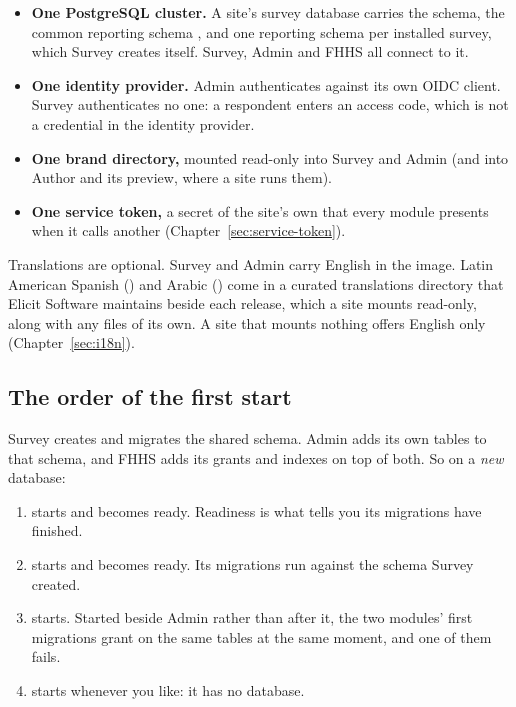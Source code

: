 \documentclass[11pt, a4paper]{article}
\begin{document}
\begin{itemize}
  \item \textbf{One PostgreSQL cluster.} A site's survey database carries the
         schema, the common reporting schema , and one
        reporting schema per installed survey, which Survey creates itself. Survey, Admin
        and FHHS all connect to it.
  \item \textbf{One identity provider.} Admin authenticates against its own OIDC client.
        Survey authenticates no one: a respondent enters an access code, which is not a
        credential in the identity provider.
  \item \textbf{One brand directory,} mounted read-only into Survey and Admin (and into
        Author and its preview, where a site runs them).
  \item \textbf{One service token,} a secret of the site's own that every module presents when
        it calls another (Chapter~\ref{sec:service-token}).
\end{itemize}

Translations are optional. Survey and Admin carry English in the image. Latin American Spanish
() and Arabic () come in a curated translations directory that
Elicit Software maintains beside each release, which a site mounts read-only, along with any
files of its own. A site that mounts nothing offers English only (Chapter~\ref{sec:i18n}).

\subsection{The order of the first start}

Survey creates and migrates the shared  schema. Admin adds its own tables to that
schema, and FHHS adds its grants and indexes on top of both. So on a \emph{new} database:

\begin{enumerate}
  \item {} starts and becomes ready. Readiness is what tells you its migrations
        have finished.
  \item {} starts and becomes ready. Its migrations run against the schema Survey
        created.
  \item {} starts. Started beside Admin rather than after it, the two modules' first
        migrations grant on the same tables at the same moment, and one of them fails.
  \item {} starts whenever you like: it has no database.
\end{enumerate}
\end{document}
